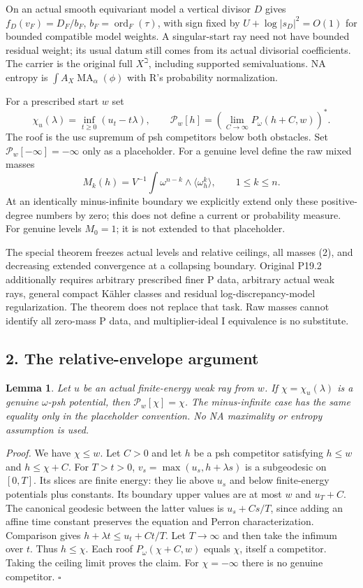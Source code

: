 \documentclass[
  11pt,
]{article}
\newtheorem{lemma}[theorem]{Lemma}
\begin{document}
On an actual smooth equivariant model a vertical divisor \(D\) gives
\(f_D(v_F)=D_F/b_F\), \(b_F=\operatorname{ord}_F(\tau)\), with sign
fixed by \(U+\log|s_D|^2=O(1)\) for bounded compatible model weights. A
singular-start ray need not have bounded residual weight; its usual
datum still comes from its actual divisorial coefficients. The carrier
is the original full \(X^\beth\), including supported semivaluations. NA
entropy is \(\int A_X\operatorname{MA}_\alpha(\phi)\) with R's
probability normalization.

For a prescribed start \(w\) set \[
\chi_u(\lambda)=\inf_{t\ge0}(u_t-t\lambda),\qquad
\mathscr P_w[h]=\left(\lim_{C\to\infty}P_\omega(h+C,w)\right)^*.
\tag{1}
\] The roof is the usc supremum of psh competitors below both obstacles.
Set \(\mathscr P_w[-\infty]=-\infty\) only as a placeholder. For a
genuine level define the raw mixed masses \[
M_k(h)=V^{-1}\int\omega^{n-k}\wedge\langle\omega_h^k\rangle,
\qquad1\le k\le n.
\tag{2}
\] At an identically minus-infinite boundary we explicitly extend only
these positive-degree numbers by zero; this does not define a current or
probability measure. For genuine levels \(M_0=1\); it is not extended to
that placeholder.

The special theorem freezes actual levels and relative ceilings, all
masses (2), and decreasing extended convergence at a collapsing
boundary. Original P19.2 additionally requires arbitrary prescribed
finer P data, arbitrary actual weak rays, general compact Kähler classes
and residual log-discrepancy-model regularization. The theorem does not
replace that task. Raw masses cannot identify all zero-mass P data, and
multiplier-ideal I equivalence is no substitute.

\subsection{2. The relative-envelope
argument}\label{the-relative-envelope-argument}

\begin{lemma}\label{relative}
Let $u$ be an actual finite-energy weak ray from $w$. If
$\chi=\chi_u(\lambda)$ is a genuine $\omega$-psh potential, then
$\mathscr P_w[\chi]=\chi$. The minus-infinite case has the same
equality only in the placeholder convention. No NA maximality or
entropy assumption is used.
\end{lemma}

\emph{Proof.} We have \(\chi\le w\). Let \(C>0\) and let \(h\) be a psh
competitor satisfying \(h\le w\) and \(h\le\chi+C\). For \(T>t>0\),
\(v_s=\max(u_s,h+\lambda s)\) is a subgeodesic on \([0,T]\). Its slices
are finite energy: they lie above \(u_s\) and below finite-energy
potentials plus constants. Its boundary upper values are at most \(w\)
and \(u_T+C\). The canonical geodesic between the latter values is
\(u_s+Cs/T\), since adding an affine time constant preserves the
equation and Perron characterization. Comparison gives
\(h+\lambda t\le u_t+Ct/T\). Let \(T\to\infty\) and then take the
infimum over \(t\). Thus \(h\le\chi\). Each roof \(P_\omega(\chi+C,w)\)
equals \(\chi\), itself a competitor. Taking the ceiling limit proves
the claim. For \(\chi=-\infty\) there is no genuine competitor.
\(\square\)
\end{document}

